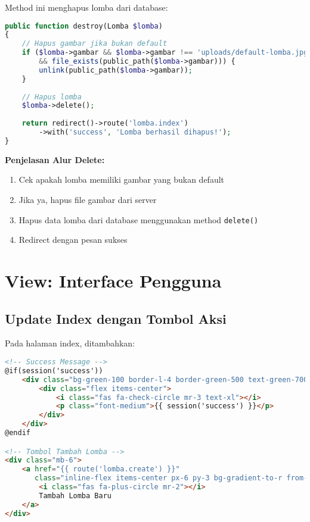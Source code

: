 \documentclass[12pt,a4paper]{article}
\begin{document}
Method ini menghapus lomba dari database:

\begin{lstlisting}[language=PHP]
public function destroy(Lomba $lomba)
{
    // Hapus gambar jika bukan default
    if ($lomba->gambar && $lomba->gambar !== 'uploads/default-lomba.jpg' 
        && file_exists(public_path($lomba->gambar))) {
        unlink(public_path($lomba->gambar));
    }
    
    // Hapus lomba
    $lomba->delete();
    
    return redirect()->route('lomba.index')
        ->with('success', 'Lomba berhasil dihapus!');
}
\end{lstlisting}

\textbf{Penjelasan Alur Delete:}
\begin{enumerate}
    \item Cek apakah lomba memiliki gambar yang bukan default
    \item Jika ya, hapus file gambar dari server
    \item Hapus data lomba dari database menggunakan method \texttt{delete()}
    \item Redirect dengan pesan sukses
\end{enumerate}

\section{View: Interface Pengguna}

\subsection{Update Index dengan Tombol Aksi}

Pada halaman index, ditambahkan:

\begin{lstlisting}[language=HTML]
<!-- Success Message -->
@if(session('success'))
    <div class="bg-green-100 border-l-4 border-green-500 text-green-700 p-4 mb-6 rounded-lg shadow-md">
        <div class="flex items-center">
            <i class="fas fa-check-circle mr-3 text-xl"></i>
            <p class="font-medium">{{ session('success') }}</p>
        </div>
    </div>
@endif

<!-- Tombol Tambah Lomba -->
<div class="mb-6">
    <a href="{{ route('lomba.create') }}" 
       class="inline-flex items-center px-6 py-3 bg-gradient-to-r from-green-500 to-green-600 text-white font-bold rounded-xl hover:from-green-600 hover:to-green-700 transform hover:scale-105 transition-all shadow-lg">
        <i class="fas fa-plus-circle mr-2"></i>
        Tambah Lomba Baru
    </a>
</div>
\end{lstlisting}
\end{document}
